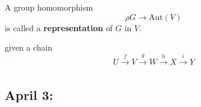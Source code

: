 \documentclass[11pt]{article}
\begin{document}
\begin{bluebox}
    A group homomorphism 
    \[ \rho  G \rightarrow \mathrm{Aut}(V) \]
    is called a \textbf{representation} of $G$ in $V$.
\end{bluebox}

\begin{bluebox}
    given a chain
    \[ U \xrightarrow[]{f} V \xrightarrow[]{g} W \xrightarrow[]{h} X  \xrightarrow[]{i} Y  \]
\end{bluebox}

\pagebreak
\subsection{April 3: }
\end{document}
